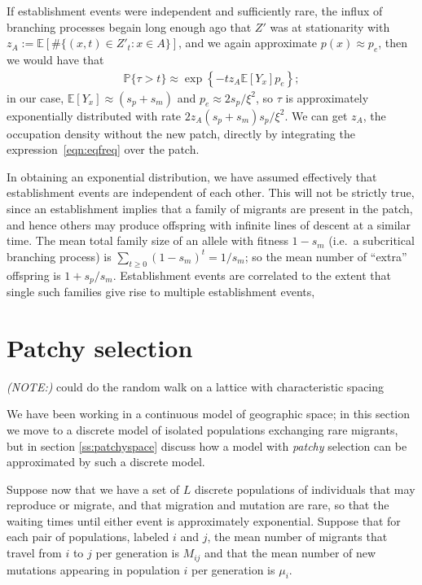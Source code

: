 \documentclass{article}
\renewcommand{\P}{\mathbb{P}}
\newcommand{\E}{\mathbb{E}}
\newcommand{\plr}[1]{{\it\color{blue}(#1)}}
\begin{document}
If establishment events were independent and sufficiently rare,
the influx of branching processes begain long enough ago that $Z'$ was at stationarity
with $z_A := \E[ \# \{ (x,t) \in Z'_t : x \in A \} ]$,
and we again approximate $p(x) \approx p_e$,
then we would have that 
\begin{align}
  \P\{\tau>t\} \approx \exp\left\{ - t z_A \E[Y_x] p_e \right\} ;
\end{align}
in our case, $\E[Y_x] \approx (s_p+s_m)$ and $p_e \approx 2 s_p/\xi^2$,
so $\tau$ is approximately exponentially distributed with rate $ 2 z_A (s_p+s_m) s_p/\xi^2 $.
We can get $z_A$, the occupation density without the new patch, 
directly by integrating the expression~\eqref{eqn:eqfreq} over the patch.

In obtaining an exponential distribution, we have assumed effectively that establishment events
are independent of each other.
This will not be strictly true, since an establishment implies that a family of migrants are present in the patch,
and hence others may produce offspring with infinite lines of descent at a similar time.
The mean total family size of an allele with fitness $1-s_m$ (i.e.\ a subcritical branching process) is $\sum_{t \ge 0} (1-s_m)^t = 1/s_m$;
so the mean number of ``extra'' offspring is $1+s_p/s_m$.
Establishment events are correlated to the extent that single such families give rise to multiple establishment events,




\section{Patchy selection} 
\label{ss:discretedemes}

\plr{NOTE:} could do the random walk on a lattice with characteristic spacing

We have been working in a continuous model of geographic space; 
in this section we move to a discrete model of isolated populations exchanging rare migrants,
but in section \ref{ss:patchyspace} discuss how a model with {\em patchy} selection can be approximated by such a discrete model.

Suppose now that we have a set of $L$ discrete populations of individuals that may reproduce or migrate,
and that migration and mutation are rare, so that the waiting times until either event is approximately exponential.
Suppose that for each pair of populations, labeled $i$ and $j$, the mean number of migrants that travel from $i$ to $j$ per generation
is $M_{ij}$ and that the mean number of new mutations appearing in population $i$ per generation is $\mu_i$.
\end{document}

